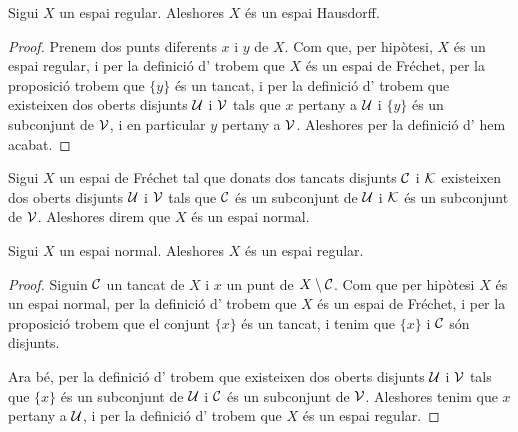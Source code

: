 \documentclass[../../Main.tex]{subfiles}
\begin{document}
	\begin{proposition}
		Sigui \(X\) un espai regular. Aleshores \(X\) és un espai Hausdorff.
		\begin{proof}
			Prenem dos punts diferents \(x\) i \(y\) de \(X\). Com que, per hipòtesi, \(X\) és un espai regular, i per la definició d' trobem que \(X\) és un espai de Fréchet, per la proposició  trobem que \(\{y\}\) és un tancat, i per la definició d' trobem que existeixen dos oberts disjunts \(\mathcal{U}\) i \(\mathcal{V}\) tals que \(x\) pertany a \(\mathcal{U}\) i \(\{y\}\) és un subconjunt de \(\mathcal{V}\), i en particular \(y\) pertany a \(\mathcal{V}\). Aleshores per la definició d' hem acabat.
		\end{proof}
	\end{proposition}
	\begin{definition}
		\label{def:espai normal}
		Sigui \(X\) un espai de Fréchet tal que donats dos tancats disjunts \(\mathcal{C}\) i \(\mathcal{K}\) existeixen dos oberts disjunts \(\mathcal{U}\) i \(\mathcal{V}\) tals que \(\mathcal{C}\) és un subconjunt de \(\mathcal{U}\) i \(\mathcal{K}\) és un subconjunt de \(\mathcal{V}\). Aleshores direm que \(X\) és un espai normal.
	\end{definition}
	\begin{proposition}
		\label{prop:els espais normals són espais regulars}
		Sigui \(X\) un espai normal. Aleshores \(X\) és un espai regular.
		\begin{proof}
			Siguin \(\mathcal{C}\) un tancat de \(X\) i \(x\) un punt de \(X\setminus\mathcal{C}\). Com que per hipòtesi \(X\) és un espai normal, per la definició d' trobem que \(X\) és un espai de Fréchet, i per la proposició  trobem que el conjunt \(\{x\}\) és un tancat, i tenim que \(\{x\}\) i \(\mathcal{C}\) són disjunts.
			
			Ara bé, per la definició d' trobem que existeixen dos oberts disjunts \(\mathcal{U}\) i \(\mathcal{V}\) tals que \(\{x\}\) és un subconjunt de \(\mathcal{U}\) i \(\mathcal{C}\) és un subconjunt de \(\mathcal{V}\). Aleshores tenim que \(x\) pertany a \(\mathcal{U}\), i per la definició d' trobem que \(X\) és un espai regular.
		\end{proof}
	\end{proposition}
\end{document}
